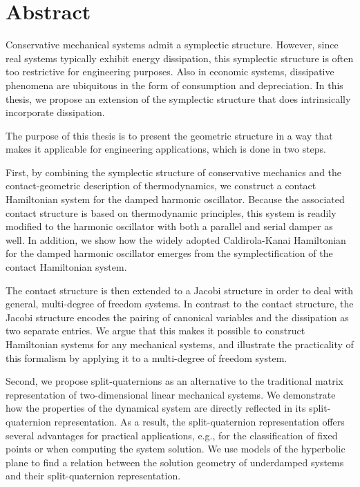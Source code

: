 \chapter*{Abstract}%

Conservative mechanical systems admit a symplectic structure. 
However, since real systems typically exhibit energy dissipation, this symplectic structure is often too restrictive for engineering purposes. 
Also in economic systems, dissipative phenomena are ubiquitous in the form of consumption and depreciation. In this thesis, we propose an extension of the symplectic structure that does intrinsically incorporate dissipation. 

The purpose of this thesis is to present the geometric structure in a way that makes it applicable for engineering applications, which is done in two steps.

First, by combining the symplectic structure of conservative mechanics and the contact-geometric description of thermodynamics, we construct a contact Hamiltonian system for the damped harmonic oscillator. 
Because the associated contact structure is based on thermodynamic principles, this system is readily modified to the harmonic oscillator with both a parallel and serial damper as well. 
In addition, we show how the widely adopted Caldirola-Kanai Hamiltonian for the damped harmonic oscillator emerges from the symplectification of the contact Hamiltonian system. 

The contact structure is then extended to a Jacobi structure in order to deal with general, multi-degree of freedom systems.
In contrast to the contact structure, the Jacobi structure encodes the pairing of canonical variables and the dissipation as two separate entries. We argue that this makes it possible to construct Hamiltonian systems for any mechanical systems, and illustrate the practicality of this formalism by applying it to a multi-degree of freedom system.

Second, we propose split-quaternions as an alternative to the traditional matrix representation of two-dimensional linear mechanical systems. 
We demonstrate how the properties of the dynamical system are directly reflected in its split-quaternion representation. 
As a result, the split-quaternion representation offers several advantages for practical applications, e.g., for the classification of fixed points or when computing the system solution. 
We use models of the hyperbolic plane to find a relation between the solution geometry of underdamped systems and their split-quaternion representation.
 
 
